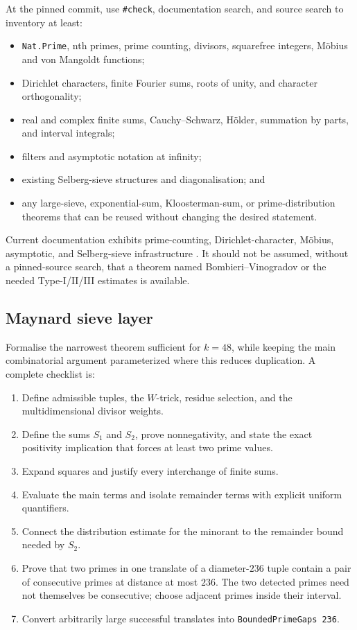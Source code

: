 \documentclass[11pt]{article}
\newcommand{\leanname}[1]{\texttt{#1}}
\begin{document}
At the pinned commit, use \leanname{\#check}, documentation search, and source
search to inventory at least:

\begin{itemize}
\item \leanname{Nat.Prime}, nth primes, prime counting, divisors, squarefree
integers, Möbius and von Mangoldt functions;
\item Dirichlet characters, finite Fourier sums, roots of unity, and character
orthogonality;
\item real and complex finite sums, Cauchy--Schwarz, Hölder, summation by parts,
and interval integrals;
\item filters and asymptotic notation at infinity;
\item existing Selberg-sieve structures and diagonalisation; and
\item any large-sieve, exponential-sum, Kloosterman-sum, or prime-distribution
theorems that can be reused without changing the desired statement.
\end{itemize}

Current documentation exhibits prime-counting, Dirichlet-character, Möbius,
asymptotic, and Selberg-sieve infrastructure
\cite{MathlibPrimeCounting,MathlibDirichlet,MathlibMoebius,MathlibAsymptotics,MathlibSelberg}.
It should not be assumed, without a pinned-source search, that a theorem named
Bombieri--Vinogradov or the needed Type-I/II/III estimates is available.

\subsection{Maynard sieve layer}

Formalise the narrowest theorem sufficient for \(k=48\), while keeping the
main combinatorial argument parameterized where this reduces duplication.  A
complete checklist is:

\begin{enumerate}[label=A\arabic*.,leftmargin=3.2em]
\item Define admissible tuples, the \(W\)-trick, residue selection, and the
  multidimensional divisor weights.
\item Define the sums \(S_1\) and \(S_2\), prove nonnegativity, and state the
  exact positivity implication that forces at least two prime values.
\item Expand squares and justify every interchange of finite sums.
\item Evaluate the main terms and isolate remainder terms with explicit
  uniform quantifiers.
\item Connect the distribution estimate for the minorant to the remainder
  bound needed by \(S_2\).
\item Prove that two primes in one translate of a diameter-\(236\) tuple contain
  a pair of consecutive primes at distance at most \(236\).  The two detected
  primes need not themselves be consecutive; choose adjacent primes inside
  their interval.
\item Convert arbitrarily large successful translates into
  \leanname{BoundedPrimeGaps 236}.
\end{enumerate}
\end{document}
